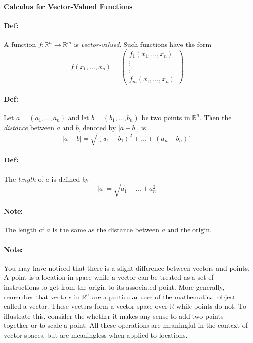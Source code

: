 \documentclass[10pt,a4paper]{article}
\begin{document}
\begin{center}
\textbf{Calculus for Vector-Valued Functions}
\end{center}

\paragraph{Def:} A function $f: \mathbb{R}^n \to \mathbb{R}^m$ is  \textit{vector-valued}. Such functions have the form
$$ f(x_1, \dots, x_n) = 
\begin{pmatrix}
f_1(x_1, \dots, x_n)\\
\vdots\\
\vdots\\
f_m(x_1, \dots, x_n)
\end{pmatrix}$$ 

\paragraph{Def:} Let $a = (a_1, \dots, a_n)$ and let $b = (b_1, \dots, b_n)$ be two points in $\mathbb{R}^n$. Then the \textit{distance} between $a$ and $b$, denoted by $|a-b|$, is
$$ |a-b| = \sqrt{(a_1-b_1)^2+\dots+(a_n-b_n)^2}$$

\paragraph{Def:} The \textit{length} of $a$ is defined by
$$ |a| = \sqrt{a_1^2+\dots+a_n^2}$$

\paragraph{Note:} The length of $a$ is the same as the distance between $a$ and the origin.

\paragraph{Note:} You may have noticed that there is a slight difference between vectors and points. A point is a location in space while a vector can be treated as a set of instructions to get from the origin to its associated point. More generally, remember that vectors in $\mathbb{R}^n$ are a particular case of the mathematical object called a vector. These vectors form a vector space over $\mathbb{R}$ while points do not. To illustrate this, consider the whether it makes any sense to add two points together or to scale a point. All these operations are meaningful in the context of vector spaces, but are meaningless when applied to locations.
\end{document}
